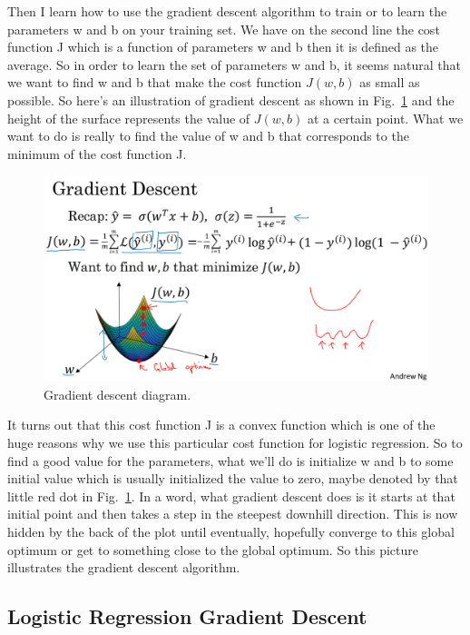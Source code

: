 \documentclass[a4paper]{article}
\begin{document}
Then I learn how to use the gradient descent algorithm to train or to learn the parameters w and b on your training set. We have on the second line the cost function J which is a function of parameters w and b then it is defined as the average. So in order to learn the set of parameters w and b, it seems natural that we want to find w and b that make the cost function $J(w,b)$ as small as possible. So here's an illustration of gradient descent as shown in Fig.~\ref{p5} and the height of the surface represents the value of $J(w,b)$ at a certain point. What we want to do is really to find the value of w and b that corresponds to the minimum of the cost function J.
\begin{figure}
	\begin{center}
		\includegraphics[scale=0.4]{figures/6.png}
	\end{center}
	\caption{Gradient descent diagram.}
	\label{p5}
\end{figure}
It turns out that this cost function J is a convex function which is one of the huge reasons why we use this particular cost function for logistic regression. So to find a good value for the parameters, what we'll do is initialize w and b to some initial value which is usually initialized the value to zero, maybe denoted by that little red dot in Fig.~\ref{p5}. In a word, what gradient descent does is it starts at that initial point and then takes a step in the steepest downhill direction. This is now hidden by the back of the plot until eventually, hopefully converge to this global optimum or get to something close to the global optimum. So this picture illustrates the gradient descent algorithm.

\subsection{Logistic Regression Gradient Descent}
\end{document}
